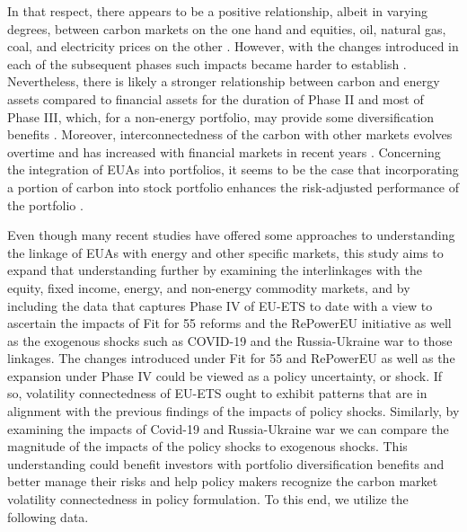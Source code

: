 \documentclass[preprint, 3p,
authoryear]{elsarticle} %
\begin{document}
In that respect, there appears to be a positive relationship, albeit in
varying degrees, between carbon markets on the one hand and equities,
oil, natural gas, coal, and electricity prices on the other
\citep{ji_information_2018, zhang_dynamic_2016, mansanet-bataller_co_2007, alberola_price_2008, keppler_causalities_2010, bredin_emerging_2011, chevallier_evaluating_2011, creti_carbon_2012, aatola_price_2013}.
However, with the changes introduced in each of the subsequent phases
such impacts became harder to establish
\citep{wu_market-linkage_2020, arouri_nonlinearities_2012}.
Nevertheless, there is likely a stronger relationship between carbon and
energy assets compared to financial assets for the duration of Phase II
and most of Phase III, which, for a non-energy portfolio, may provide
some diversification benefits
\citep{lovcha_determinants_2022, tan_how_2020, yang_idiosyncratic_2022}.
Moreover, interconnectedness of the carbon with other markets evolves
overtime and has increased with financial markets in recent years
\citep{dong_risk_2024, jimenez-rodriguez_what_2019, tan_how_2020}.
Concerning the integration of EUAs into portfolios, it seems to be the
case that incorporating a portion of carbon into stock portfolio
enhances the risk-adjusted performance of the portfolio
\citep{demiralay_carbon_2022}.

Even though many recent studies have offered some approaches to
understanding the linkage of EUAs with energy and other specific
markets, this study aims to expand that understanding further by
examining the interlinkages with the equity, fixed income, energy, and
non-energy commodity markets, and by including the data that captures
Phase IV of EU-ETS to date with a view to ascertain the impacts of Fit
for 55 reforms and the RePowerEU initiative as well as the exogenous
shocks such as COVID-19 and the Russia-Ukraine war to those linkages.
The changes introduced under Fit for 55 and RePowerEU as well as the
expansion under Phase IV could be viewed as a policy uncertainty, or
shock. If so, volatility connectedness of EU-ETS ought to exhibit
patterns that are in alignment with the previous findings of the impacts
of policy shocks. Similarly, by examining the impacts of Covid-19 and
Russia-Ukraine war we can compare the magnitude of the impacts of the
policy shocks to exogenous shocks. This understanding could benefit
investors with portfolio diversification benefits and better manage
their risks and help policy makers recognize the carbon market
volatility connectedness in policy formulation. To this end, we utilize
the following data.
\end{document}

